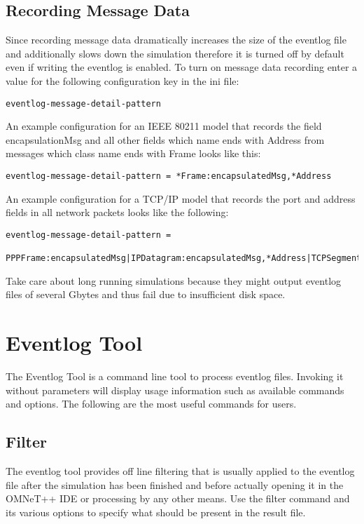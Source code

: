 \subsection{Recording Message Data}
Since recording message data dramatically increases the size of the eventlog file and
additionally slows down the simulation therefore it is turned off by default even if
writing the eventlog is enabled. To turn on message data recording enter a value for the
following configuration key in the ini file:
\begin{verbatim}
eventlog-message-detail-pattern
\end{verbatim}
An example configuration for an IEEE 80211 model that records the field encapsulationMsg
and all other fields which name ends with Address from messages which class name ends with
Frame looks like this:
\begin{verbatim}
eventlog-message-detail-pattern = *Frame:encapsulatedMsg,*Address
\end{verbatim}
An example configuration for a TCP/IP model that records the port and address fields in
all network packets looks like the following:
\begin{verbatim}
eventlog-message-detail-pattern =
 PPPFrame:encapsulatedMsg|IPDatagram:encapsulatedMsg,*Address|TCPSegment:*Port
\end{verbatim}
\begin{note}
Take care about long running simulations because they might output eventlog files of
several Gbytes and thus fail due to insufficient disk space.
\end{note}

\section{Eventlog Tool}
The Eventlog Tool is a command line tool to process eventlog files. Invoking it without
parameters will display usage information such as available commands and options. The
following are the most useful commands for users.

\subsection{Filter}
The eventlog tool provides off line filtering that is usually applied to the eventlog file
after the simulation has been finished and before actually opening it in the OMNeT++ IDE
or processing by any other means. Use the filter command and its various options to
specify what should be present in the result file.

